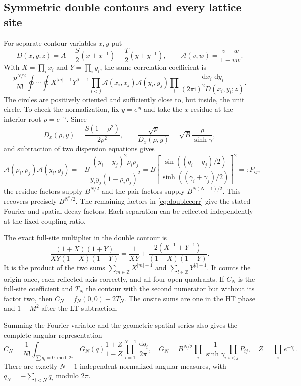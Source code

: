 \documentclass[11pt]{article}
\numberwithin{equation}{section}
\theoremstyle{definition}
\newcommand{\Z}{\mathbb Z}
\newcommand{\dd}{\,\mathrm d}
\newcommand{\ii}{\mathrm i}
\newcommand{\cA}{\mathscr A}
\begin{document}
\subsection{Symmetric double contours and every lattice site}
For separate contour variables $x,y$ put
\begin{equation}\label{eq:Dpoly}
 D(x,y;z)=A-\frac S2(x+x^{-1})-\frac T2(y+y^{-1}),\qquad
 \cA(v,w)=\frac{v-w}{1-vw}.
\end{equation}
With $X=\prod_i x_i$ and $Y=\prod_i y_i$, the same correlation
coefficient is
\begin{equation}\label{eq:doublecorr}
 \frac{p^{N/2}}{N!}\oint\cdots\oint
 X^{|m|-1}Y^{|l|-1}
 \prod_{i<j}\cA(x_i,x_j)\cA(y_i,y_j)
 \prod_i\frac{\dd x_i\,\dd y_i}{(2\pi\ii)^2D(x_i,y_i;z)}.
\end{equation}
The circles are positively oriented and sufficiently close to, but inside,
the unit circle. To check the normalization, fix $y=e^{\ii q}$ and
take the $x$ residue at the interior root $\rho=e^{-\gamma}$.
Since
\[
 D_x(\rho,y)=\frac{S(1-\rho^2)}{2\rho^2},\qquad
 \frac{\sqrt p}{D_x(\rho,y)}=\sqrt B\frac{\rho}{\sinh\gamma},
\]
and subtraction of two dispersion equations gives
\begin{equation}\label{eq:cancelpair}
 \cA(\rho_i,\rho_j)\cA(y_i,y_j)
 =-B\frac{(y_i-y_j)^2\rho_i\rho_j}
           {y_iy_j(1-\rho_i\rho_j)^2}
 =B\left[\frac{\sin((q_i-q_j)/2)}
               {\sinh((\gamma_i+\gamma_j)/2)}\right]^2=:P_{ij},
\end{equation}
the residue factors supply $B^{N/2}$ and the pair factors supply
$B^{N(N-1)/2}$. This recovers precisely $B^{N^2/2}$.
The remaining factors in \eqref{eq:doublecorr} give the stated Fourier
and spatial decay factors. Each separation can be reflected
independently at the fixed coupling ratio.

The exact full-site multiplier in the double contour is
\begin{equation}\label{eq:allsites}
 \frac{(1+X)(1+Y)}{XY(1-X)(1-Y)}
 =\frac1{XY}+\frac{2(X^{-1}+Y^{-1})}{(1-X)(1-Y)}.
\end{equation}
It is the product of the two sums $\sum_{m\in\Z}X^{|m|-1}$ and
$\sum_{l\in\Z}Y^{|l|-1}$. It counts the origin once, each reflected
axis correctly, and all four open quadrants. If $C_N$ is the full-site
coefficient and $T_N$ the contour with the second numerator but without
its factor two, then $C_N=f_N(0,0)+2T_N$. The onsite sums are one in
the HT phase and $1-M^2$ after the LT subtraction.

Summing the Fourier variable and the geometric spatial series also gives
the complete angular representation
\begin{equation}\label{eq:fullangular}
 C_N=\frac1{N!}\int_{\sum q_i=0\bmod2\pi}
 G_N(q)\frac{1+Z}{1-Z}\prod_{i=1}^{N-1}\frac{\dd q_i}{2\pi},\quad
 G_N=B^{N/2}\prod_i\frac1{\sinh\gamma_i}\prod_{i<j}P_{ij},\quad
 Z=\prod_i e^{-\gamma_i}.
\end{equation}
There are exactly $N-1$ independent normalized angular measures, with
$q_N=-\sum_{i<N}q_i$ modulo $2\pi$.
\end{document}
